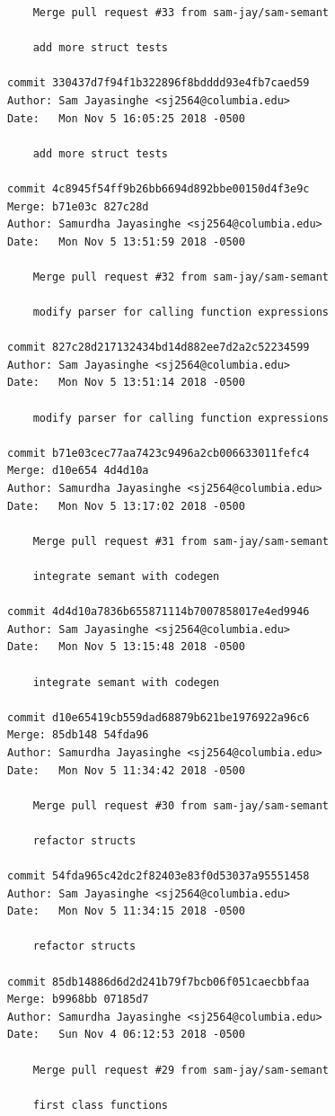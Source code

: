 \documentclass[12pt]{article}
\begin{document}
\begin{lstlisting}
    Merge pull request #33 from sam-jay/sam-semant
    
    add more struct tests

commit 330437d7f94f1b322896f8bdddd93e4fb7caed59
Author: Sam Jayasinghe <sj2564@columbia.edu>
Date:   Mon Nov 5 16:05:25 2018 -0500

    add more struct tests

commit 4c8945f54ff9b26bb6694d892bbe00150d4f3e9c
Merge: b71e03c 827c28d
Author: Samurdha Jayasinghe <sj2564@columbia.edu>
Date:   Mon Nov 5 13:51:59 2018 -0500

    Merge pull request #32 from sam-jay/sam-semant
    
    modify parser for calling function expressions

commit 827c28d217132434bd14d882ee7d2a2c52234599
Author: Sam Jayasinghe <sj2564@columbia.edu>
Date:   Mon Nov 5 13:51:14 2018 -0500

    modify parser for calling function expressions

commit b71e03cec77aa7423c9496a2cb006633011fefc4
Merge: d10e654 4d4d10a
Author: Samurdha Jayasinghe <sj2564@columbia.edu>
Date:   Mon Nov 5 13:17:02 2018 -0500

    Merge pull request #31 from sam-jay/sam-semant
    
    integrate semant with codegen

commit 4d4d10a7836b655871114b7007858017e4ed9946
Author: Sam Jayasinghe <sj2564@columbia.edu>
Date:   Mon Nov 5 13:15:48 2018 -0500

    integrate semant with codegen

commit d10e65419cb559dad68879b621be1976922a96c6
Merge: 85db148 54fda96
Author: Samurdha Jayasinghe <sj2564@columbia.edu>
Date:   Mon Nov 5 11:34:42 2018 -0500

    Merge pull request #30 from sam-jay/sam-semant
    
    refactor structs

commit 54fda965c42dc2f82403e83f0d53037a95551458
Author: Sam Jayasinghe <sj2564@columbia.edu>
Date:   Mon Nov 5 11:34:15 2018 -0500

    refactor structs

commit 85db14886d6d2d241b79f7bcb06f051caecbbfaa
Merge: b9968bb 07185d7
Author: Samurdha Jayasinghe <sj2564@columbia.edu>
Date:   Sun Nov 4 06:12:53 2018 -0500

    Merge pull request #29 from sam-jay/sam-semant
    
    first class functions


\end{lstlisting}
\end{document}
